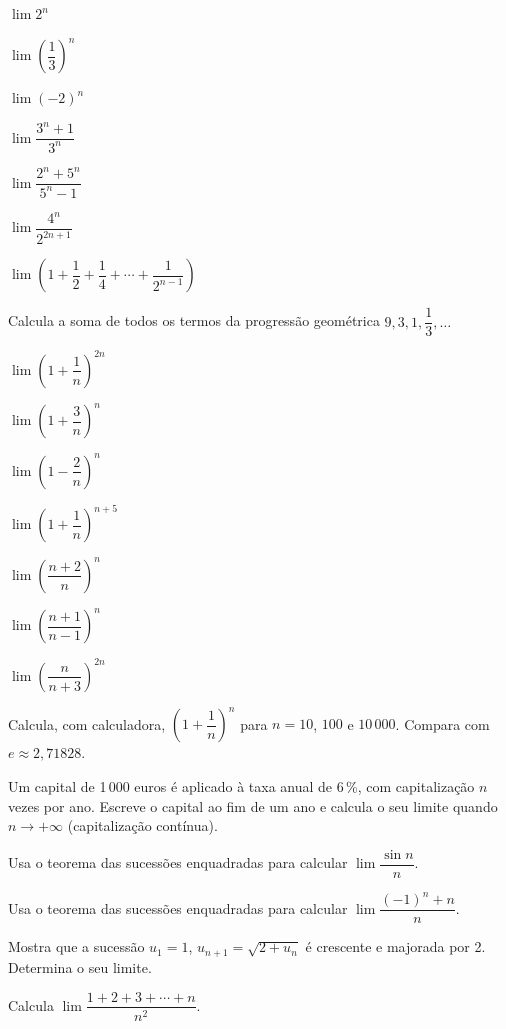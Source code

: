 \documentclass[12pt]{article}
\begin{document}
\begin{exercicios}
  \item $\lim 2^n$
  \item $\lim \left(\dfrac{1}{3}\right)^n$
  \item $\lim (-2)^n$
  \item $\lim \dfrac{3^n + 1}{3^n}$
  \item $\lim \dfrac{2^n + 5^n}{5^n - 1}$
  \item $\lim \dfrac{4^n}{2^{2n+1}}$
  \item $\lim \left(1 + \dfrac{1}{2} + \dfrac{1}{4} + \cdots + \dfrac{1}{2^{n-1}}\right)$
  \item Calcula a soma de todos os termos da progressão geométrica $9, 3, 1, \dfrac{1}{3}, \ldots$
\end{exercicios}

\begin{exercicios}
  \item $\lim \left(1 + \dfrac{1}{n}\right)^{2n}$
  \item $\lim \left(1 + \dfrac{3}{n}\right)^n$
  \item $\lim \left(1 - \dfrac{2}{n}\right)^n$
  \item $\lim \left(1 + \dfrac{1}{n}\right)^{n+5}$
  \item $\lim \left(\dfrac{n + 2}{n}\right)^n$
  \item $\lim \left(\dfrac{n + 1}{n - 1}\right)^n$
  \item $\lim \left(\dfrac{n}{n + 3}\right)^{2n}$
  \item Calcula, com calculadora, $\left(1 + \dfrac{1}{n}\right)^n$ para $n = 10$, $100$ e $10\,000$. Compara com $e \approx 2{,}71828$.
\end{exercicios}

\begin{exercicios}
  \item Um capital de 1\,000 euros é aplicado à taxa anual de 6\,\%, com capitalização $n$ vezes por ano. Escreve o capital ao fim de um ano e calcula o seu limite quando $n \to +\infty$ (capitalização contínua).
  \item Usa o teorema das sucessões enquadradas para calcular $\lim \dfrac{\sin n}{n}$.
  \item Usa o teorema das sucessões enquadradas para calcular $\lim \dfrac{(-1)^n + n}{n}$.
  \item Mostra que a sucessão $u_1 = 1$, $u_{n+1} = \sqrt{2 + u_n}$ é crescente e majorada por 2. Determina o seu limite.
  \item Calcula $\lim \dfrac{1 + 2 + 3 + \cdots + n}{n^2}$.
\end{exercicios}
\end{document}
